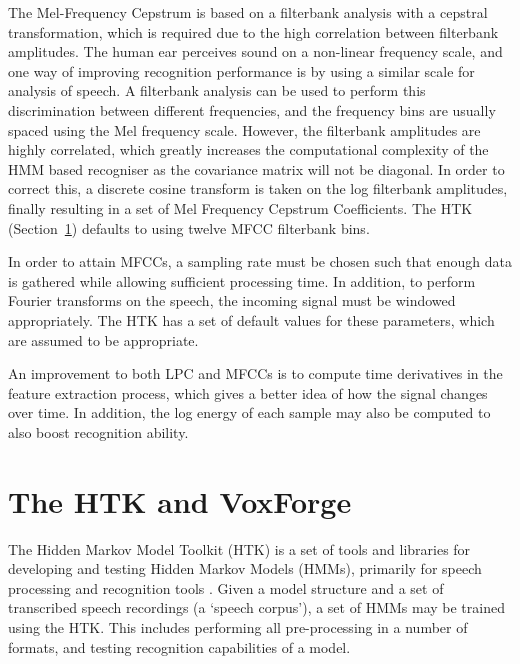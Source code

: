 	The Mel-Frequency Cepstrum is based on a filterbank analysis with a cepstral transformation, which is required due to the high correlation between filterbank amplitudes.  The human ear perceives sound on a non-linear frequency scale, and one way of improving recognition performance is by using a similar scale for analysis of speech.  A filterbank analysis can be used to perform this discrimination between different frequencies, and the frequency bins are usually spaced using the Mel frequency scale.  However, the filterbank amplitudes are highly correlated, which greatly increases the computational complexity of the HMM based recogniser as the covariance matrix will not be diagonal.  In order to correct this, a discrete cosine transform is taken on the log filterbank amplitudes, finally resulting in a set of Mel Frequency Cepstrum Coefficients.  The HTK (Section~\ref{sec:the_htk}) defaults to using twelve MFCC filterbank bins. \cite{htkbook} \cite{melnikoff2003speech}

	In order to attain MFCCs, a sampling rate must be chosen such that enough data is gathered while allowing sufficient processing time.  In addition, to perform Fourier transforms on the speech, the incoming signal must be windowed appropriately.  The HTK has a set of default values for these parameters, which are assumed to be appropriate.

	An improvement to both LPC and MFCCs is to compute time derivatives in the feature extraction process, which gives a better idea of how the signal changes over time.  In addition, the log energy of each sample may also be computed to also boost recognition ability.


\section{The HTK and VoxForge} %
\label{sec:the_htk}
	The Hidden Markov Model Toolkit (HTK) is a set of tools and libraries for developing and testing Hidden Markov Models (HMMs), primarily for speech processing and recognition tools \cite{htkbook}.  Given a model structure and a set of transcribed speech recordings (a `speech corpus'), a set of HMMs may be trained using the HTK.  This includes performing all pre-processing in a number of formats, and testing recognition capabilities of a model.

